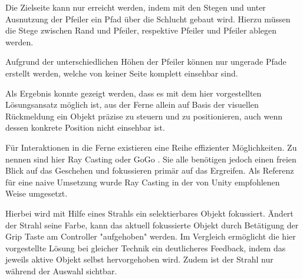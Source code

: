\documentclass[25pt, a0paper, portrait, margin=0mm, innermargin=15mm,blockverticalspace=15mm, colspace=15mm, subcolspace=8mm, ngerman]{tikzposter}
\begin{document}
\begin{columns}
\begin{subcolumns}
{            Die Zielseite kann nur erreicht werden, indem mit den Stegen und unter Ausnutzung der Pfeiler ein Pfad über die Schlucht gebaut wird. Hierzu müssen die Stege zwischen Rand und Pfeiler, respektive Pfeiler und Pfeiler ablegen werden.
            
            \vspace{1em}
            
            Aufgrund der unterschiedlichen Höhen der Pfeiler können nur ungerade Pfade erstellt werden, welche von keiner Seite komplett einsehbar sind.
            
            \vspace{-5cm}
        }

    
        {
            Als Ergebnis konnte gezeigt werden, dass es mit dem hier vorgestellten Lösungsansatz möglich ist, aus der Ferne allein auf Basis der visuellen Rückmeldung ein Objekt präzise zu steuern und zu positionieren, auch wenn dessen konkrete Position nicht einsehbar ist.
            
            \vspace{-2cm}
        }
        
        {
             Für Interaktionen in die Ferne existieren eine Reihe effizienter Möglichkeiten. Zu nennen sind hier Ray Casting oder GoGo \cite{Grabbing}. Sie alle benötigen jedoch einen freien Blick auf das Geschehen und fokussieren primär auf das Ergreifen. Als Referenz für eine naive Umsetzung wurde Ray Casting in der von Unity empfohlenen Weise \cite{Raycast} umgesetzt. 
            
            \vspace{1em}
            
            Hierbei wird mit Hilfe eines Strahls ein selektierbares Objekt fokussiert. Ändert der Strahl seine Farbe, kann das aktuell fokussierte Objekt durch Betätigung der Grip Taste am Controller "aufgehoben" werden. Im Vergleich ermöglicht die hier vorgestellte Lösung bei gleicher Technik ein deutlicheres Feedback, indem das jeweils aktive Objekt selbst hervorgehoben wird. Zudem ist der Strahl nur während der Auswahl sichtbar.
            
            \vspace{1em}
            
}
\end{subcolumns}
\end{columns}
\end{document}
